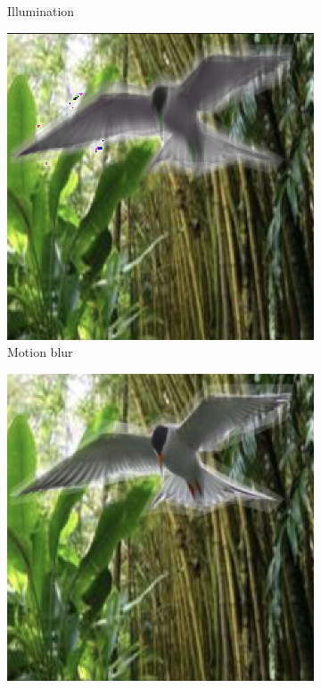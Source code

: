 \begin{figure}[t]
\begin{center}
\begin{subfigure}[b]{0.2\textwidth}
  \caption{Illumination}
  \label{fig:WB_light_dark}
\end{subfigure}
\begin{subfigure}[b]{0.2\textwidth}
  \includegraphics[width=0.99\linewidth]{plotsAistats/water-bird_motion_blurred.png}
  \caption{Motion blur}
  \label{fig:WB_motion_blur}
\end{subfigure}
\begin{subfigure}[b]{0.2\textwidth}
  \includegraphics[width=0.99\linewidth]{plotsAistats/waterbird_original_example.png}

\end{subfigure}
\end{center}
\end{figure}
